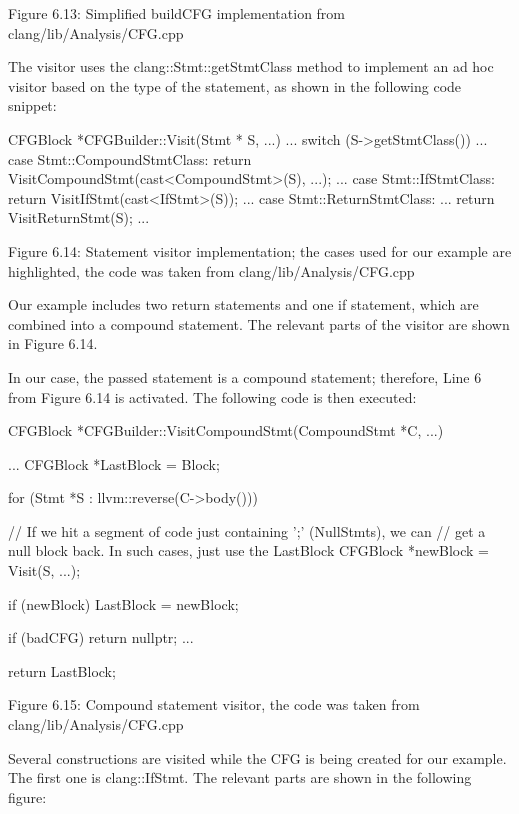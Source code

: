 \begin{center}
Figure 6.13: Simplified buildCFG implementation from clang/lib/Analysis/CFG.cpp
\end{center}

The visitor uses the clang::Stmt::getStmtClass method to implement an ad hoc visitor based on the type of the statement, as shown in the following code snippet:

\begin{cpp}
CFGBlock *CFGBuilder::Visit(Stmt * S, ...) {
  ...
  switch (S->getStmtClass()) {
  ...
  case Stmt::CompoundStmtClass:
  return VisitCompoundStmt(cast<CompoundStmt>(S), ...);
  ...
  case Stmt::IfStmtClass:
  return VisitIfStmt(cast<IfStmt>(S));
  ...
  case Stmt::ReturnStmtClass:
  ...
  return VisitReturnStmt(S);
  ...
  }
}
\end{cpp}


\begin{center}
Figure 6.14: Statement visitor implementation; the cases used for our example are highlighted, the code was taken from clang/lib/Analysis/CFG.cpp
\end{center}

Our example includes two return statements and one if statement, which are combined into a compound statement. The relevant parts of the visitor are shown in Figure 6.14.

In our case, the passed statement is a compound statement; therefore, Line 6 from Figure 6.14 is activated. The following code is then executed:

\begin{cpp}
CFGBlock *CFGBuilder::VisitCompoundStmt(CompoundStmt *C, ...) {
  ...
  CFGBlock *LastBlock = Block;

  for (Stmt *S : llvm::reverse(C->body())) {
    // If we hit a segment of code just containing ’;’ (NullStmts), we can
    // get a null block back.  In such cases, just use the LastBlock
    CFGBlock *newBlock = Visit(S, ...);

    if (newBlock)
      LastBlock = newBlock;

    if (badCFG)
      return nullptr;
    ...
  }

  return LastBlock;
}
\end{cpp}


\begin{center}
Figure 6.15: Compound statement visitor, the code was taken from clang/lib/Analysis/CFG.cpp
\end{center}

Several constructions are visited while the CFG is being created for our example. The first one is clang::IfStmt. The relevant parts are shown in the following figure:

